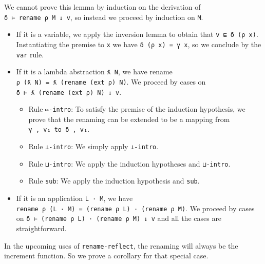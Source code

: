 We cannot prove this lemma by induction on the derivation of
\texttt{δ\ ⊢\ rename\ ρ\ M\ ↓\ v}, so instead we proceed by induction on
\texttt{M}.

\begin{itemize}
\item
  If it is a variable, we apply the inversion lemma to obtain that
  \texttt{v\ ⊑\ δ\ (ρ\ x)}. Instantiating the premise to \texttt{x} we
  have \texttt{δ\ (ρ\ x)\ =\ γ\ x}, so we conclude by the \texttt{var}
  rule.
\item
  If it is a lambda abstraction \texttt{ƛ\ N}, we have rename
  \texttt{ρ\ (ƛ\ N)\ =\ ƛ\ (rename\ (ext\ ρ)\ N)}. We proceed by cases
  on \texttt{δ\ ⊢\ ƛ\ (rename\ (ext\ ρ)\ N)\ ↓\ v}.

  \begin{itemize}
  \item
    Rule \texttt{↦-intro}: To satisfy the premise of the induction
    hypothesis, we prove that the renaming can be extended to be a
    mapping from \texttt{γ\ ,\ v₁\ to\ δ\ ,\ v₁}.
  \item
    Rule \texttt{⊥-intro}: We simply apply \texttt{⊥-intro}.
  \item
    Rule \texttt{⊔-intro}: We apply the induction hypotheses and
    \texttt{⊔-intro}.
  \item
    Rule \texttt{sub}: We apply the induction hypothesis and
    \texttt{sub}.
  \end{itemize}
\item
  If it is an application \texttt{L\ ·\ M}, we have
  \texttt{rename\ ρ\ (L\ ·\ M)\ =\ (rename\ ρ\ L)\ ·\ (rename\ ρ\ M)}.
  We proceed by cases on
  \texttt{δ\ ⊢\ (rename\ ρ\ L)\ ·\ (rename\ ρ\ M)\ ↓\ v} and all the
  cases are straightforward.
\end{itemize}

In the upcoming uses of \texttt{rename-reflect}, the renaming will
always be the increment function. So we prove a corollary for that
special case.

